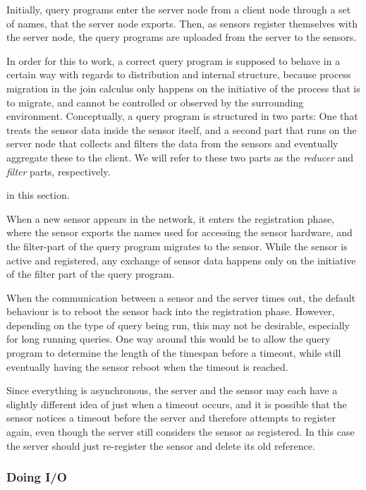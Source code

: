 Initially, query programs enter the server node from a client node
through a set of names, that the server node exports.
Then, as sensors register themselves with the server node, the query
programs are uploaded from the server to the sensors.

In order for this to work, a correct query program is supposed to
behave in a certain way with regards to distribution and internal
structure, because process migration in the join calculus only happens on
the initiative of the process that is to migrate, and cannot be controlled
or observed by the surrounding environment.
Conceptually, a query program is structured in two parts: One that
treats the sensor data inside the sensor itself, and a second part
that runs on the server node that collects and filters the data from
the sensors and eventually aggregate these to the client. We will refer
to these two parts as the \emph{reducer} and \emph{filter} parts, respectively.

in this section.

When a new sensor appears in the network, it enters the registration
phase, where the sensor exports the names used for accessing the 
sensor hardware, and the filter-part of the query program migrates to
the sensor.
While the sensor is active and registered, any exchange of sensor data
happens only on the initiative of the filter part of the query
program.

When the communication between a sensor and the server times out, the
default behaviour is to reboot the sensor back into the registration
phase.
However, depending on the type of query being run, this may not be desirable,
especially for long running queries.
One way around this would be to allow the query program to determine
the length of the timespan before a timeout, while still eventually 
having the sensor reboot when the timeout is reached.

Since everything is asynchronous, the server and the sensor may each
have a slightly different idea of just when a timeout occurs, and it
is possible that the sensor notices a timeout before the server and
therefore attempts to register again, even though the server still
considers the sensor as registered. In this case the server should
just re-register the sensor and delete its old reference.

\subsubsection{Doing I/O}

